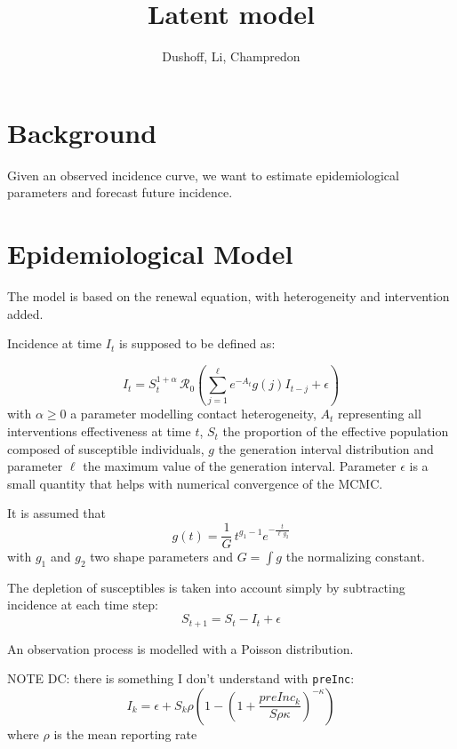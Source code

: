 \documentclass[12pt]{article}
\title{Latent model}
\author{Dushoff, Li, Champredon}
\newcommand{\Ro}{\mathcal{R}_0}
\begin{document}
\maketitle



\section{Background}

Given an observed incidence curve, we want to estimate epidemiological parameters and forecast future incidence.

\section{Epidemiological Model}

The model is based on the renewal equation, with heterogeneity and intervention added.

Incidence at time $I_t$ is supposed to be defined as:

\begin{equation}
I_t = S_t^{1+\alpha}\, \Ro \left( \sum_{j=1}^{\ell} e^{-A_t} g(j) I_{t-j}   + \epsilon \right)
\label{eq:renewal}
\end{equation}
with $\alpha\geq 0$ a parameter modelling contact heterogeneity, $A_t$ representing all interventions effectiveness at time $t$, $S_t$ the proportion of the effective population composed of susceptible individuals, $g$ the generation interval distribution and parameter $\ell$ the maximum value of the generation interval. Parameter $\epsilon$ is a small quantity that helps with numerical convergence of the MCMC.

It is assumed that 
$$ g(t) = \frac{1}{G}\, t^{g_1 -1} e^{-\frac{t}{\ell\, g_2}}$$
with $g_1$ and $g_2$ two shape parameters and $G=\int g$ the normalizing constant.

The depletion of susceptibles is taken into account simply by subtracting incidence at each time step:
\begin{equation}
S_{t+1} = S_t - I_t + \epsilon
\end{equation}



An observation process is modelled with a Poisson distribution.


NOTE DC: there is something I don't understand with \texttt{preInc}:
$$I_k = \epsilon + S_k \rho (1-(1+\frac{preInc_k}{S\rho\kappa})^{-\kappa})$$
where $\rho$ is the mean reporting rate
\end{document}
